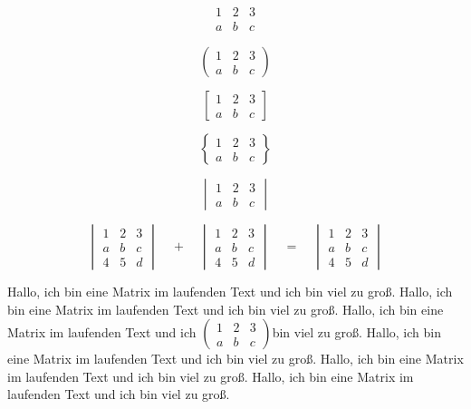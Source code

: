 \documentclass[12pt,ngerman,parskip=full]{scrartcl}
\begin{document}
\begin{equation}
\begin{matrix}
	1 & 2 & 3\\
	a & b & c
\end{matrix}
\end{equation}

\begin{equation}
	\begin{pmatrix}
		1 & 2 & 3\\
		a & b & c
	\end{pmatrix}
\end{equation}

\begin{equation}
	\begin{bmatrix}
		1 & 2 & 3\\
		a & b & c
	\end{bmatrix}
\end{equation}

\begin{equation}
	\begin{Bmatrix}
		1 & 2 & 3\\
		a & b & c
	\end{Bmatrix}
\end{equation}

\begin{equation}
	\begin{vmatrix}
		1 & 2 & 3\\
		a & b & c
	\end{vmatrix}
\end{equation}

\begin{equation}
	\begin{vmatrix}
		1 & 2 & 3\\
		a & b & c \\
		4 & 5 & d 
	\end{vmatrix}
\quad+\quad 
	\begin{vmatrix}
	1 & 2 & 3\\
	a & b & c \\
	4 & 5 & d 
\end{vmatrix}
\quad=\quad
	\begin{vmatrix}
	1 & 2 & 3\\
	a & b & c \\
	4 & 5 & d 
\end{vmatrix}
\end{equation}

Hallo, ich bin eine Matrix im laufenden Text und ich bin viel zu groß. Hallo, ich bin eine Matrix im laufenden Text und ich bin viel zu groß. Hallo, ich bin eine Matrix im laufenden Text und ich 
\(	\begin{pmatrix}
	1 & 2 & 3\\
	a & b & c
\end{pmatrix}
\)bin viel zu groß. Hallo, ich bin eine Matrix im laufenden Text und ich bin viel zu groß. Hallo, ich bin eine Matrix im laufenden Text und ich bin viel zu groß. Hallo, ich bin eine Matrix im laufenden Text und ich bin viel zu groß. 
\end{document}

